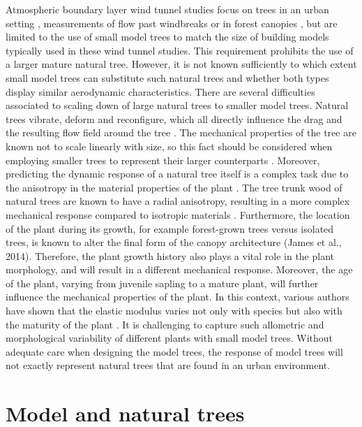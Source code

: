 Atmospheric boundary layer wind tunnel studies focus on trees in an urban setting \citep{Gromke2011,Gromke2008a}, measurements of flow past windbreaks \citep{Guan2003} or in forest canopies \citep{Bai2013,Conan2015,Kinnersley1994}, but are limited to the use of small model trees to match the size of building models typically used in these wind tunnel studies. This requirement prohibits the use of a larger mature natural tree. However, it is not known sufficiently to which extent small model trees can substitute such natural trees and whether both types display similar aerodynamic characteristics. There are several difficulties associated to scaling down of large natural trees to smaller model trees. Natural trees vibrate, deform and reconfigure, which all directly influence the drag and the resulting flow field around the tree \citep{Schouveiler2006,Tadrist2014,Vogel1989}. The mechanical properties of the tree are known not to scale linearly with size, so this fact should be considered when employing smaller trees to represent their larger counterparts \citep{DeLangre2008}. Moreover, predicting the dynamic response of a natural tree itself is a complex task due to the anisotropy in the material properties of the plant \citep{James2017}. The tree trunk wood of natural trees are known to have a radial anisotropy, resulting in a more complex mechanical response compared to isotropic materials \citep{Albrecht2016}. Furthermore, the location of the plant during its growth, for example forest-grown trees versus isolated trees, is known to alter the final form of the canopy architecture (James et al., 2014). Therefore, the plant growth history also plays a vital role in the plant morphology, and will result in a different mechanical response. Moreover, the age of the plant, varying from juvenile sapling to a mature plant, will further influence the mechanical properties of the plant. In this context, various authors have shown that the elastic modulus varies not only with species but also with the maturity of the plant \citep{Dahle2010,Macdonald2002,Telewski1995,Watt2008,Woodrum2003}. It is challenging to capture such allometric and morphological variability of different plants with small model trees. Without adequate care when designing the model trees, the response of model trees will not exactly represent natural trees that are found in an urban environment.

\section{Model and natural trees}

